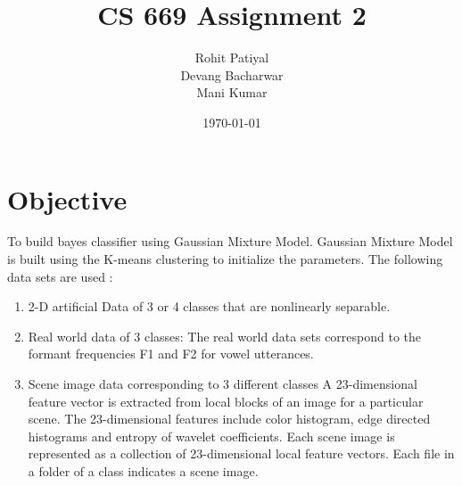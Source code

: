 \documentclass[a4paper]{article}
\title{CS 669 Assignment 2}
\author{Rohit Patiyal \\ Devang Bacharwar \\ Mani Kumar}
\date{\today}
\begin{document}
\maketitle

\vspace{2.0cm}

\tableofcontents

\clearpage

\section {Objective}
	To build bayes classifier using Gaussian Mixture Model. Gaussian Mixture Model
	is built using the K-means clustering to initialize the parameters. The
	following data sets are used :
	\begin{enumerate}
		\item{2-D artificial Data of 3 or 4 classes that are nonlinearly
		separable.}
			
		\item{Real world data of 3 classes: The real world data sets correspond to
			  the formant frequencies F1 and F2 for vowel utterances.}
		\item{Scene image data corresponding to 3 different classes 
			A 23-dimensional feature vector is extracted from local blocks of an image for
	a particular scene. The 23-dimensional features include color histogram, edge
	directed histograms and entropy of wavelet coefficients. Each scene image is represented as a collection of 23-dimensional local feature vectors. 
	Each file in a folder of a class indicates a scene image.}
	\end{enumerate}
	
		
\vspace{1.0cm}
\end{document}
